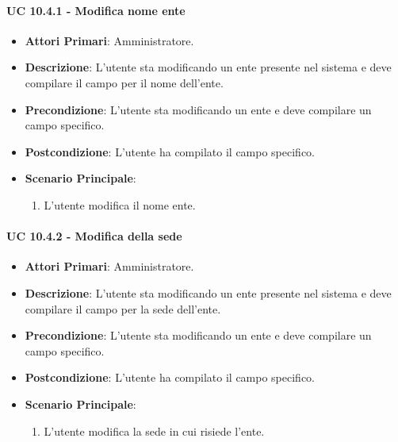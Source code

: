 				\paragraph{UC 10.4.1 - Modifica nome ente}
				\begin{itemize}
					\item \textbf{Attori Primari}: Amministratore.
					\item \textbf{Descrizione}: L'utente sta modificando un ente presente nel sistema e deve compilare il campo per il nome dell'ente.
					\item \textbf{Precondizione}: L'utente sta modificando un ente e deve compilare un campo specifico.
					\item \textbf{Postcondizione}: L'utente ha compilato il campo specifico.
					\item \textbf{Scenario Principale}:
					\begin{enumerate}
						\item L'utente modifica il nome ente.
					\end{enumerate}	
				\end{itemize}	

				\paragraph{UC 10.4.2 - Modifica della sede}
				\begin{itemize}
					\item \textbf{Attori Primari}: Amministratore.
					\item \textbf{Descrizione}: L'utente sta modificando un ente presente nel sistema e deve compilare il campo per la sede dell'ente.
					\item \textbf{Precondizione}: L'utente sta modificando un ente e deve compilare un campo specifico.
					\item \textbf{Postcondizione}: L'utente ha compilato il campo specifico.
					\item \textbf{Scenario Principale}:
					\begin{enumerate}
						\item L'utente modifica la sede in cui risiede l'ente.
					\end{enumerate}	
				\end{itemize}	


